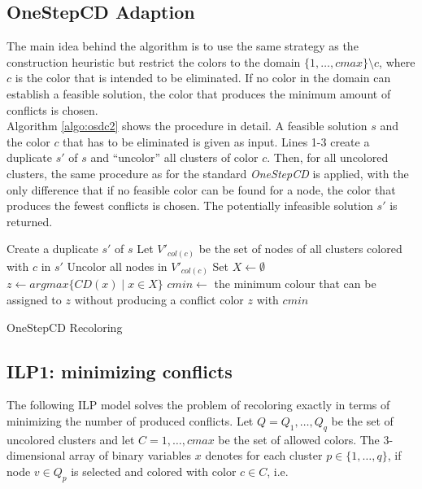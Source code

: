 \subsection{OneStepCD Adaption}
The main idea behind the algorithm is to use the same strategy as the construction heuristic but restrict the colors to the domain $\{1,\ldots,cmax\}\setminus c$, where $c$ is the color that is intended to be eliminated. If no color in the domain can establish a feasible solution, the color that produces the minimum amount of conflicts is chosen.\\
Algorithm \ref{algo:osdc2} shows the procedure in detail. A feasible solution $s$ and the color $c$ that has to be eliminated is given as input. Lines 1-3 create a duplicate $s'$ of $s$ and ``uncolor'' all clusters of color $c$. Then, for all uncolored clusters, the same procedure as for the standard \textit{OneStepCD} is applied, with the only difference that if no feasible color can be found for a node, the color that produces the fewest conflicts is chosen. The potentially infeasible solution $s'$ is returned.

\begin{algorithm}[h]
Create a duplicate $s'$ of $s$\;
Let $V'_{col(c)}$ be the set of nodes of all clusters colored with $c$ in $s'$\;
Uncolor all nodes in $V'_{col(c)}$\;
 {
  Set $X \gets \emptyset $\;
  $z \gets argmax\{CD(x) \mid x \in X \}$\;
  $cmin \gets$ the minimum colour that can be assigned to $z$ without producing a conflict\;
  color $z$ with $cmin$\;
}
\;
\caption{OneStepCD Recoloring}
\label{algo:osdc2}
\end{algorithm}

\clearpage

\subsection{ILP1: minimizing conflicts}
\label{sec:ilp1}

The following ILP model solves the problem of recoloring exactly in terms of minimizing the number of produced conflicts. Let $Q = {Q_1,\ldots,Q_q}$ be the set of uncolored clusters and let $C=1,\ldots,cmax$ be the set of allowed colors. The 3-dimensional array of binary variables $x$ denotes for each cluster $p \in \{1,\ldots , q\}$, if node $v \in Q_p$ is selected and colored with color $c \in C$, i.e. 

